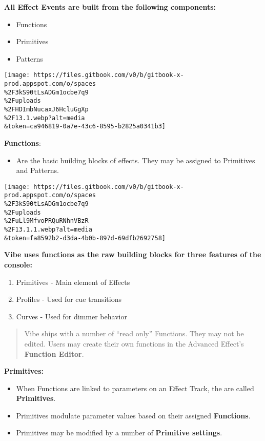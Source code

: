 \documentclass[
]{article}
\providecommand{\tightlist}{%
  \setlength{\itemsep}{0pt}\setlength{\parskip}{0pt}}
\begin{document}
\textbf{All Effect Events are built from the following components:}

\begin{itemize}
\item
  Functions
\item
  Primitives
\item
  Patterns
\end{itemize}

\texttt{[image: https://files.gitbook.com/v0/b/gitbook-x-prod.appspot.com/o/spaces\\\%2F3kS90tLsADGm1ocbe7q9\\\%2Fuploads\\\%2FHDImbNucaxJ6HcluGgXp\\\%2F13.1.webp?alt=media\\\&token=ca946819-0a7e-43c6-8595-b2825a0341b3]}

\textbf{Functions}:

\begin{itemize}
\tightlist
\item
  Are the basic building blocks of effects. They may be assigned to Primitives and Patterns.
\end{itemize}

\texttt{[image: https://files.gitbook.com/v0/b/gitbook-x-prod.appspot.com/o/spaces\\\%2F3kS90tLsADGm1ocbe7q9\\\%2Fuploads\\\%2FuLl9MfvoPRQuRNhnVBzR\\\%2F13.1.1.webp?alt=media\\\&token=fa8592b2-d3da-4b0b-897d-69dfb2692758]}

\textbf{Vibe uses functions as the raw building blocks for three features of the console:}

\begin{enumerate}
\def\labelenumi{\arabic{enumi}.}
\item
  Primitives - Main element of Effects
\item
  Profiles - Used for cue transitions
\item
  Curves - Used for dimmer behavior
\end{enumerate}

\begin{quote}
Vibe ships with a number of ``read only'' Functions. They may not be edited. Users may create their own functions in the Advanced Effect's \textbf{Function Editor}.
\end{quote}

\textbf{Primitives:}

\begin{itemize}
\item
  When Functions are linked to parameters on an Effect Track, the are called \textbf{Primitives}.
\item
  Primitives modulate parameter values based on their assigned \textbf{Functions}.
\item
  Primitives may be modified by a number of \textbf{Primitive settings}.
\end{itemize}
\end{document}
